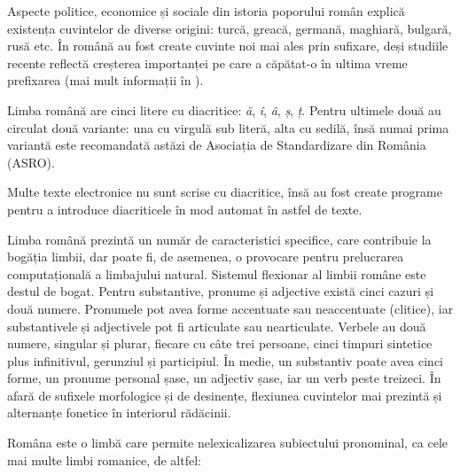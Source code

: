 \documentclass[]{../../metanetpaper}
\begin{document}
\begin{multicols}{2}
Aspecte politice, economice și sociale din istoria poporului român explică existența cuvintelor de diverse origini: turcă, greacă, germană, maghiară, bulgară, rusă etc. În română au fost create cuvinte noi mai ales prin sufixare, deși studiile recente reflectă creșterea importanței pe care a căpătat-o în ultima vreme prefixarea (mai mult informații în \cite{brancus}).


Limba română are cinci litere cu diacritice: \textit{ă}, \textit{î}, \textit{â}, \textit{ș}, \textit{ț}. Pentru ultimele două au circulat două variante: una cu virgulă sub literă, alta cu sedilă, însă numai prima variantă este recomandată astăzi de Asociația de Standardizare din România (ASRO). 

Multe texte electronice nu sunt scrise cu diacritice, însă au fost create programe pentru a introduce diacriticele în mod automat în astfel de texte.

Limba română prezintă un număr de caracteristici specifice, care contribuie la bogăția limbii, dar poate fi, de asemenea, o provocare pentru prelucrarea computațională a limbajului natural. Sistemul flexionar al limbii române este destul de bogat. Pentru substantive, pronume și adjective există cinci cazuri și două numere. Pronumele pot avea forme accentuate sau neaccentuate (clitice), iar substantivele și adjectivele pot fi articulate sau nearticulate. Verbele au două numere, singular și plurar, fiecare cu câte trei persoane, cinci timpuri sintetice plus infinitivul, gerunziul și participiul. În medie, un substantiv poate avea cinci forme, un pronume personal șase, un adjectiv șase, iar un verb peste treizeci. În afară de sufixele morfologice și de desinențe, flexiunea cuvintelor mai prezintă și alternanțe fonetice în interiorul rădăcinii.


Româna este o limbă care permite nelexicalizarea subiectului pronominal, ca cele mai multe limbi romanice, de altfel: 


\end{multicols}
\end{document}

